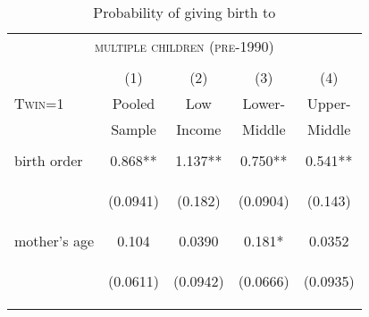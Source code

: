 \documentclass{article}[11pt,subeqn]
\begin{document}
\begin{spacing}{1.5}
\label{scn:apptables}
\begin{table}[htpb!]
\caption{Probability of giving birth to}
\vspace{-7mm}
\label{tab:twinreg1990}
\begin{center}
\begin{tabular}{lcccc} 
\multicolumn{5}{c}{\textsc{multiple children (pre-1990)}}\\
& & \\
\toprule
 & (1) & (2) & (3) & (4) \\
\textsc{Twin=1} & Pooled & Low & Lower- & Upper- \\ 
 & Sample & Income & Middle & Middle \\  \midrule
\vspace{4pt} & \begin{footnotesize}\end{footnotesize} & \begin{footnotesize}\end{footnotesize} & \begin{footnotesize}\end{footnotesize} & \begin{footnotesize}\end{footnotesize} \\
birth order & 0.868** & 1.137** & 0.750** & 0.541** \\
\vspace{4pt} & \begin{footnotesize}(0.0941)\end{footnotesize} & \begin{footnotesize}(0.182)\end{footnotesize} & \begin{footnotesize}(0.0904)\end{footnotesize} & \begin{footnotesize}(0.143)\end{footnotesize} \\
mother's age & 0.104 & 0.0390 & 0.181* & 0.0352 \\
\vspace{4pt} & \begin{footnotesize}(0.0611)\end{footnotesize} & \begin{footnotesize}(0.0942)\end{footnotesize} & \begin{footnotesize}(0.0666)\end{footnotesize} & \begin{footnotesize}(0.0935)\end{footnotesize} \\

\end{tabular}
\end{center}
\end{table}
\end{spacing}
\end{document}
